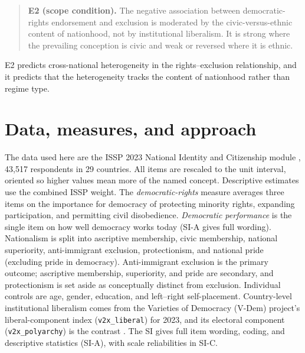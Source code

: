 \begin{quote}
\textbf{E2 (scope condition).} The negative association between democratic-rights endorsement and exclusion is moderated by the civic-versus-ethnic content of nationhood, not by institutional liberalism. It is strong where the prevailing conception is civic and weak or reversed where it is ethnic.
\end{quote}

E2 predicts cross-national heterogeneity in the rights--exclusion relationship, and it predicts that the heterogeneity tracks the content of nationhood rather than regime type.

\section{Data, measures, and approach}\label{data-measures-and-approach}

The data used here are the ISSP 2023 National Identity and Citizenship module \citep{issp2023}, 43,517 respondents in 29 countries. All items are rescaled to the unit interval, oriented so higher values mean more of the named concept. Descriptive estimates use the combined ISSP weight. The \emph{democratic-rights} measure averages three items on the importance for democracy of protecting minority rights, expanding participation, and permitting civil disobedience. \emph{Democratic performance} is the single item on how well democracy works today (SI-A gives full wording). Nationalism is split into ascriptive membership, civic membership, national superiority, anti-immigrant exclusion, protectionism, and national pride (excluding pride in democracy). Anti-immigrant exclusion is the primary outcome; ascriptive membership, superiority, and pride are secondary, and protectionism is set aside as conceptually distinct from exclusion. Individual controls are age, gender, education, and left--right self-placement. Country-level institutional liberalism comes from the Varieties of Democracy (V-Dem) project's liberal-component index (\texttt{v2x\_liberal}) for 2023, and its electoral component (\texttt{v2x\_polyarchy}) is the contrast \citep{vdem2025}. The SI gives full item wording, coding, and descriptive statistics (SI-A), with scale reliabilities in SI-C.

